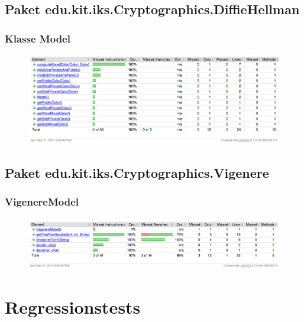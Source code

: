 \documentclass{article}
\begin{document}
  \subsection{Paket edu.kit.iks.Cryptographics.DiffieHellman}
    \subsubsection{Klasse Model}
      \begin{figure}[H]
        \centering
          \includegraphics[width=\textwidth]{resources/coverage_diffiehellman_model}
      \end{figure}

  \subsection{Paket edu.kit.iks.Cryptographics.Vigenere}
    \subsubsection{VigenereModel}
      \begin{figure}[H]
        \centering
          \includegraphics[width=\textwidth]{resources/coverage_vigenere_model}
      \end{figure}
\clearpage

\section{Regressionstests}
\end{document}
